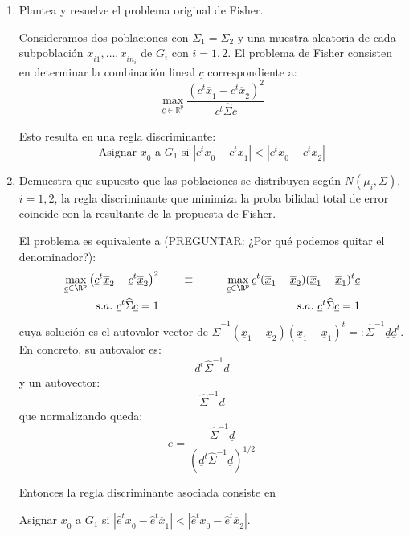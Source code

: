 \documentclass[twoside]{article}
\newcommand{\muestra}[1]{{\underline{#1}}}
\newcommand{\m}[1]{{\muestra{#1}}}
\begin{document}
\begin{enumerate}
\begin{enumerate}
	\item Plantea y resuelve el problema original de Fisher. 

	\begin{sol}
	Consideramos dos poblaciones con $\Sigma_1 = \Sigma_2$ y una muestra aleatoria de cada subpoblación $\m{x}_{i1},\dots,\m{x}_{in_i}$ de $G_i$ con $i=1,2$.
	El problema de Fisher consisten en determinar la combinación lineal $\m{c}$ correspondiente a:
	\[ \max_{\m{c} \in \mathbb{R}^p} \frac{\left(\m{c}^t \m{\overline{x}}_1-\m{c}^t \m{\overline{x}}_2\right)^2}{\m{c}^t \widehat{\Sigma} \m{c}} \]
	
	Esto resulta en una regla discriminante:
	\[ \text{Asignar }\m{x}_0\text{ a }G_1\text{ si }|\m{c}^t \m{x}_0 - \m{c}^t\m{\overline{x}}_1 | < |\m{c}^t\m{x}_0 - \m{c}^t\m{\overline{x}}_2| \]
	\end{sol}

	\item Demuestra que supuesto que las poblaciones se distribuyen según $N(\mu_i, \Sigma)$, $i = 1, 2$, la regla discriminante que minimiza la proba bilidad total de error coincide con la resultante de la propuesta de Fisher.

	\begin{sol}
	El problema es equivalente a (PREGUNTAR: ¿Por qué podemos quitar el denominador?):
	\begin{align*}
	\max_{\m{c} \in \R^p} \left(\m{c}^t\m{\overline{x}}_2-\m{c}^t\m{\overline{x}}_2\right)^2 & \qquad \equiv \qquad & \max_{\m{c} \in \R^p} \m{c}^t(\m{\overline{x}}_1-\m{\overline{x}}_2)(\m{\overline{x}}_1-\m{\overline{x}}_1)^t \m{c} \\
	s.a.\ \m{c}^t \widehat{\Sigma} \m{c} = 1 & & s.a.\ \m{c}^t \widehat{\Sigma} \m{c} = 1
	\end{align*}
	cuya solución es el autovalor-vector de $\widehat{\Sigma}^{-1} (\m{\overline{x}}_1-\m{\overline{x}}_2)(\m{\overline{x}}_1-\m{\overline{x}}_1)^t =: \widehat{\Sigma}^{-1}\m{d}\m{d}^t$. En concreto, su autovalor es:
	\[ \m{d}^t \widehat{\Sigma}^{-1} \m{d} \]
	y un autovector:
	\[ \widehat{\Sigma}^{-1}\m{d} \]
	que normalizando queda:
	\[ \m{e} = \frac{\widehat{\Sigma}^{-1}\m{d}}{\left(\m{d}^t \widehat{\Sigma}^{-1}\m{d}\right)^{1/2}}\]

	Entonces la regla discriminante asociada consiste en 
	\begin{center}Asignar $\m{x}_0$ a $G_1$ si $|\widehat{e}^t \m{x}_0 - \widehat{e}^t \m{\overline{x}}_1| < |\widehat{e}^t \m{x}_0 - \widehat{e}^t \m{\overline{x}}_2|$.\end{center}


\end{sol}
\end{enumerate}
\end{enumerate}
\end{document}
